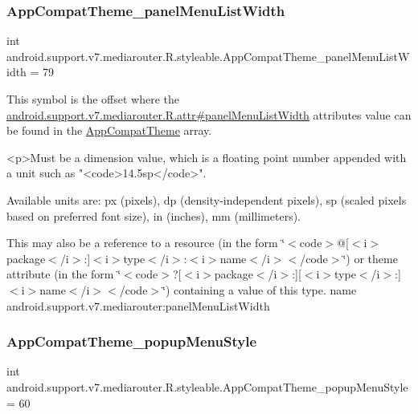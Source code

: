 \subsubsection{\texorpdfstring{App\+Compat\+Theme\+\_\+panel\+Menu\+List\+Width}{AppCompatTheme\_panelMenuListWidth}}
{\footnotesize\ttfamily int android.\+support.\+v7.\+mediarouter.\+R.\+styleable.\+App\+Compat\+Theme\+\_\+panel\+Menu\+List\+Width = 79\hspace{0.3cm}{\ttfamily [static]}}

This symbol is the offset where the \hyperlink{classandroid_1_1support_1_1v7_1_1mediarouter_1_1R_1_1attr_a687e9ffbf613fdf2d33d6a6e2ad23d0e}{android.\+support.\+v7.\+mediarouter.\+R.\+attr\#panel\+Menu\+List\+Width} attribute\textquotesingle{}s value can be found in the \hyperlink{classandroid_1_1support_1_1v7_1_1mediarouter_1_1R_1_1styleable_a4e3d3900c75d49aeb2f283cac00214d6}{App\+Compat\+Theme} array.

\begin{DoxyVerb}      <p>Must be a dimension value, which is a floating point number appended with a unit such as "<code>14.5sp</code>".
\end{DoxyVerb}
 Available units are\+: px (pixels), dp (density-\/independent pixels), sp (scaled pixels based on preferred font size), in (inches), mm (millimeters). 

This may also be a reference to a resource (in the form \char`\"{}$<$code$>$@\mbox{[}$<$i$>$package$<$/i$>$\+:\mbox{]}$<$i$>$type$<$/i$>$\+:$<$i$>$name$<$/i$>$$<$/code$>$\char`\"{}) or theme attribute (in the form \char`\"{}$<$code$>$?\mbox{[}$<$i$>$package$<$/i$>$\+:\mbox{]}\mbox{[}$<$i$>$type$<$/i$>$\+:\mbox{]}$<$i$>$name$<$/i$>$$<$/code$>$\char`\"{}) containing a value of this type.  name android.\+support.\+v7.\+mediarouter\+:panel\+Menu\+List\+Width \mbox{\label{classandroid_1_1support_1_1v7_1_1mediarouter_1_1R_1_1styleable_a56f5c9d8f50624e515a07a5936318b79}} 
\subsubsection{\texorpdfstring{App\+Compat\+Theme\+\_\+popup\+Menu\+Style}{AppCompatTheme\_popupMenuStyle}}
{\footnotesize\ttfamily int android.\+support.\+v7.\+mediarouter.\+R.\+styleable.\+App\+Compat\+Theme\+\_\+popup\+Menu\+Style = 60\hspace{0.3cm}{\ttfamily [static]}}

